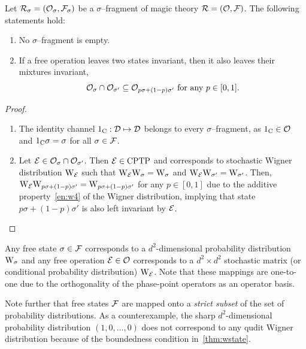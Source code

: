 \begin{proposition}\label{thm:frag_app}
    Let $\mathcal{R}_\sigma = (\mathcal{O}_\sigma, \mathcal{F}_\sigma)$ be a $\sigma$--fragment of magic theory $\mathcal{R} = (\mathcal{O}, \mathcal{F})$. 
    The following statements hold:
    \begin{enumerate}
        \item No $\sigma$--fragment is empty.
        \item If a free operation leaves two states invariant, then it also leaves their mixtures invariant, 
        \begin{equation*}
            \mathcal{O}_{\sigma} \cap \mathcal{O}_{\sigma'} \subseteq \mathcal{O}_{p\sigma + (1-p)\sigma'}\ \text{for any}\ p \in [0,1].
        \end{equation*}
    \end{enumerate}
\end{proposition}
\begin{proof}$ $\vspace{-12pt}\\

\begin{enumerate}
    \item The identity channel $1_{\rm{C}}: \mathcal{D} \mapsto \mathcal{D}$ belongs to every $\sigma$--fragment, as $1_{\rm{C}} \in \mathcal{O}$ and $1_{\rm{C}}\sigma = \sigma$ for all $\sigma \in \mathcal{F}$.
    
    \item Let $\mathcal{E} \in \mathcal{O}_{\sigma} \cap \mathcal{O}_{\sigma'}$.
    Then $\mathcal{E} \in {\rm{CPTP}}$ and corresponds to stochastic Wigner distribution $\W{\E}$ such that $\W{\E} \W{\sigma} = \W{\sigma}$ and $\W{\E} \W{\sigma'} = \W{\sigma'}$.
    Then, $\W{\E} \W{p\sigma + (1-p)\sigma'} = \W{p\sigma + (1-p)\sigma'}$ for any $p \in [0,1]$ due to the additive property~\ref{en:w4} of the Wigner distribution, implying that state $p\sigma + (1-p)\sigma'$ is also left invariant by $\mathcal{E}$.
\end{enumerate}
\vspace{-20pt}
\end{proof}

Any free state $\sigma \in \mathcal{F}$ corresponds to a $d^2$-dimensional probability distribution $\W{\sigma}$ and any free operation $\mathcal{E} \in \mathcal{O}$ corresponds to a $d^2 \times d^2$ stochastic matrix (or conditional probability distribution) $\W{\E}$.
Note that these mappings are one-to-one due to the orthogonality of the phase-point operators as an operator basis.

Note further that free states $\mathcal{F}$ are mapped onto a \emph{strict subset} of the set of probability distributions.
As a counterexample, the sharp $d^2$-dimensional probability distribution $(1, 0, \dots, 0)$ does not correspond to any qudit Wigner distribution because of the boundedness condition in~\cref{thm:wstate}.

